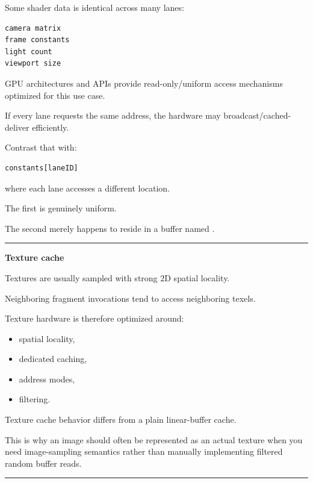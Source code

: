 Some shader data is identical across many lanes:

\protect{}\label{xfh30n}%
\begin{verbatim}
camera matrix
frame constants
light count
viewport size
\end{verbatim}

GPU architectures and APIs provide read-only/uniform access mechanisms optimized for this use case.

If every lane requests the same address, the hardware may broadcast/cached-deliver efficiently.

Contrast that with:

\protect{}\label{7e3tbt}%
\begin{verbatim}
constants[laneID]
\end{verbatim}

where each lane accesses a different location.

The first is genuinely uniform.

The second merely happens to reside in a buffer named .

\begin{center}\rule{0.5\linewidth}{0.5pt}\end{center}

\textbf{Texture cache}

Textures are usually sampled with strong 2D spatial locality.

Neighboring fragment invocations tend to access neighboring texels.

Texture hardware is therefore optimized around:

\begin{itemize}
\tightlist
\item
  spatial locality,
\item
  dedicated caching,
\item
  address modes,
\item
  filtering.
\end{itemize}

Texture cache behavior differs from a plain linear-buffer cache.

This is why an image should often be represented as an actual texture when you need image-sampling semantics rather than manually implementing filtered random buffer reads.

\begin{center}\rule{0.5\linewidth}{0.5pt}\end{center}

